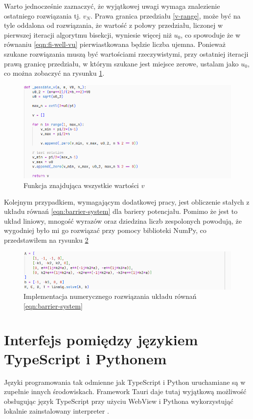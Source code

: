 \documentclass{SGGW-thesis}
\begin{document}
Warto jednocześnie zaznaczyć, że wyjątkowej uwagi wymaga znalezienie ostatniego rozwiązania tj. $v_N$. Prawa granica przedziału \ref{v-range}, może być na tyle oddalona od rozwiązania, że wartość z połowy przedziału, liczonej w pierwszej iteracji algorytmu bisekcji, wyniesie więcej niż $u_0$, co spowoduje że w równaniu \ref{eqn:fi-well-vu} pierwiastkowana będzie liczba ujemna. Ponieważ szukane rozwiązania muszą być wartościami rzeczywistymi, przy ostatniej iteracji prawą granicę przedziału, w którym szukane jest miejsce zerowe, ustalam jako $u_0$, co można zobaczyć na rysunku \ref{fig:bisection2}.
	\begin{figure}[H]
		\includegraphics[width=\textwidth,height=\textheight,keepaspectratio]{bisection2.png} 
		\caption{Funkcja znajdująca wszystkie wartości $v$}
		\label{fig:bisection2}
	\end{figure}
	
	Kolejnym przypadkiem, wymagającym dodatkowej pracy, jest obliczenie stałych z układu równań \ref{eqn:barrier-system} dla bariery potencjału. Pomimo że jest to układ liniowy, mnogość wyrazów oraz dziedzina liczb zespolonych powodują, że wygodniej było mi go rozwiązać przy pomocy biblioteki NumPy, co przedstawiłem na rysunku \ref{fig:linalg-solve}
	
	\begin{figure}[H]
		\includegraphics[width=\textwidth,height=\textheight,keepaspectratio]{linalg solve.png} 
		\caption{Implementacja numerycznego rozwiązania układu równań \ref{eqn:barrier-system}}
		\label{fig:linalg-solve}
	\end{figure}

		
	\section{Interfejs pomiędzy językiem TypeScript i Pythonem}
		Języki programowania tak odmienne jak TypeScript i Python uruchamiane są w zupełnie innych środowiskach. Framework Tauri daje tutaj wyjątkową możliwość obsługując język TypeScript przy użyciu WebView \cite{tauri-arch} i Pythona wykorzystująć lokalnie zainstalowany interpreter \cite{tauri-shell}.
		
\end{document}
